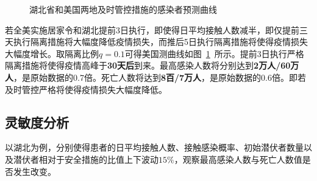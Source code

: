 \documentclass{whutmod}
\begin{document}
                        \begin{figure}[H]
        	\centering
        	\caption{湖北省和美国两地及时管控措施的感染者预测曲线}\label{lasssbel}
        \end{figure}
        
        若全美实施居家令和湖北提前3日执行，即使得日平均接触人数减半，即仅提前三天执行隔离措施将大幅度降低疫情损失，而推后5日执行隔离措施将使得疫情损失大幅度增长。取隔离比例$q=0.1$可得美国测曲线如图~\ref{lasssbel}~所示。提前3日执行严格隔离措施将使得疫情高峰于\textbf{30天后}到来。最高感染人数将分别达到\textbf{2万人/60万人}，是原始数据的0.7倍。死亡人数将达到\textbf{8百/7万人}，是原始数据的0.6倍。即若及时管控严格将使得疫情损失大幅度降低。
        
        	
        \subsection{灵敏度分析}
        以湖北为例，分别使得患者的日平均接触人数、接触感染概率、初始潜伏者数量以及潜伏者相对于安全措施的比值上下波动$15\%$，观察最高感染人数与死亡人数值是否发生改变。
        
\end{document}

